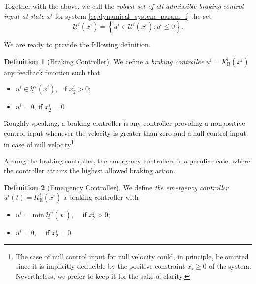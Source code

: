 \documentclass[letterpaper, 10 pt, conference]{ieeeconf}
\newcounter{Definition}
\theoremstyle{definition}
\theoremstyle{nopoint}
\newtheorem{definitionNoPoint}{Definition}
\begin{document}
Together with the above, we call the {\em robust set of all admissible braking control input at state $x^i$} for system \eqref{eq:dynamical_system_param_i} the set
\begin{equation}\label{eq:admissible_braking_inputs}
\underline{\mathcal{U}}^i(x^i)=\left\{u^i\in\mathcal{U}^i(x^i): u^i\leq 0 \right\}.
\end{equation}

We are ready to provide the following definition.
\begin{definitionNoPoint}[Braking  Controller]
We define a {\em braking  controller} $u^i= K^i_\mathrm{B}(x^i)$ any feedback function such that
\begin{itemize}
\item $u^i \in \underline{\mathcal{U}}^i(x^i)$, \, \quad if $x_2^i >0$;
\item $u^i=0$, \qquad \quad \; if $x_2^i =0$.
\end{itemize} 
\end{definitionNoPoint}


Roughly speaking, a braking controller is any controller providing a nonpositive control input whenever the velocity is greater than zero and a null control input in case of null velocity\footnote{The case of null control input for null velocity could, in principle, be omitted since it is implicitly deducible by the positive constraint $x_2^i\geq 0$ of the system. Nevertheless, we prefer to keep it for the sake of clarity.}

Among the braking  controller, the emergency controllers is a peculiar case, where the controller attains the highest allowed braking  action.

\begin{definitionNoPoint}[Emergency Controller]\label{def:emergency_controller}
We define  {\em the emergency controller} $u^i(t)= K^i_\mathrm{E}(x^i)$ a braking  controller with
\begin{itemize}
\item $u^i = \min \underline{\mathcal{U}}^i(x^i)$, \, \, \quad if $x_2^i >0$;
\item $u^i=0$, \qquad \qquad \quad \, \, if $x_2^i =0$.
\end{itemize} 
\end{definitionNoPoint}
\end{document}
